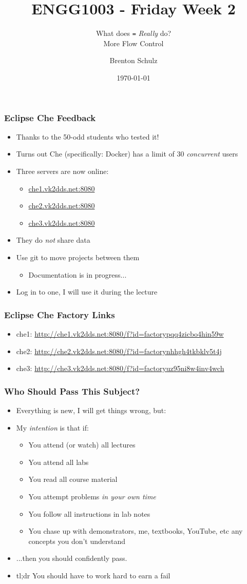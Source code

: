 \documentclass[14pt]{beamer}
\title{ENGG1003 - Friday Week 2}
\subtitle{What does \texttt{=} \textit{Really} do?\\More Flow Control}
\author{Brenton Schulz}
\institute{University of Newcastle}
\date{\today}
\begin{document}
\titlepage

\begin{frame}
\frametitle{Eclipse Che Feedback}
\begin{itemize}
\item Thanks to the 50-odd students who tested it!
\item Turns out Che (specifically: Docker) has a limit of 30 \textit{concurrent} users
\item Three servers are now online:
	\begin{itemize}
		\item \url{che1.vk2dds.net:8080}
		\item \url{che2.vk2dds.net:8080}
		\item \url{che3.vk2dds.net:8080}
	\end{itemize}
\item They do \textit{not} share data
\item Use git to move projects between them
	\begin{itemize}
		\item Documentation is in progress...
	\end{itemize}
\item Log in to one, I will use it during the lecture
\end{itemize}
\end{frame}

\begin{frame}
\frametitle{Eclipse Che Factory Links}
\begin{itemize}
\item che1: \url{http://che1.vk2dds.net:8080/f?id=factorypqq4zicbo4hin59w}
\item che2: \url{http://che2.vk2dds.net:8080/f?id=factorynhhgh4tkbklv5t4j}
\item che3: \url{http://che3.vk2dds.net:8080/f?id=factoryuz95ni8w4inv4wch}
\end{itemize}
\end{frame}

\begin{frame}
\frametitle{Who Should Pass This Subject?}
\begin{itemize}
\item Everything is new, I will get things wrong, but:
\item My \textit{intention} is that if:
	\begin{itemize}
		\item You attend (or watch) all lectures
		\item You attend all labs
		\item You read all course material
		\item You attempt problems \textit{in your own time}
		\item You follow all instructions in lab notes
		\item You chase up with demonstrators, me, textbooks, YouTube, etc any concepts you don't understand
	\end{itemize}
\item ...then you should confidently pass.
\item tl;dr You should have to work hard to earn a fail
\end{itemize}
\end{frame}
\end{document}
